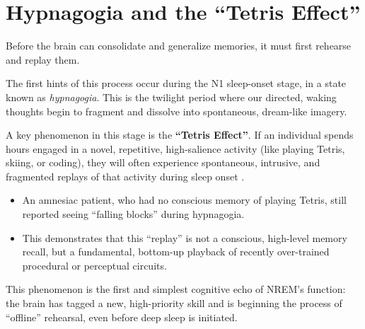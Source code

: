 \section{Hypnagogia and the ``Tetris Effect''}\label{sec:hypnagogia}

Before the brain can consolidate and generalize memories, it must first rehearse and replay them.

The first hints of this process occur during the N1 sleep-onset stage, in a state known as \textit{hypnagogia}. This is the twilight period where our directed, waking thoughts begin to fragment and dissolve into spontaneous, dream-like imagery.

A key phenomenon in this stage is the \textbf{``Tetris Effect''}. If an individual spends hours engaged in a novel, repetitive, high-salience activity (like playing Tetris, skiing, or coding), they will often experience spontaneous, intrusive, and fragmented replays of that activity during sleep onset \citep{stickgold2000tetris}.
\begin{itemize}
    \item An amnesiac patient, who had no conscious memory of playing Tetris, still reported seeing ``falling blocks'' during hypnagogia.
    \item This demonstrates that this ``replay'' is not a conscious, high-level memory recall, but a fundamental, bottom-up playback of recently over-trained procedural or perceptual circuits.
\end{itemize}
This phenomenon is the first and simplest cognitive echo of NREM's function: the brain has tagged a new, high-priority skill and is beginning the process of ``offline'' rehearsal, even before deep sleep is initiated.
